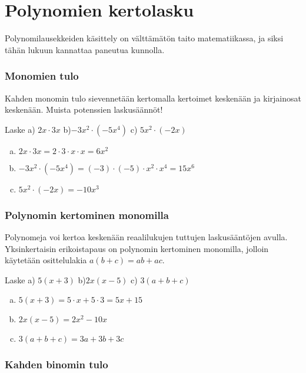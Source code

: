 \section{Polynomien kertolasku}

Polynomilausekkeiden käsittely on välttämätön taito matematiikassa, ja siksi tähän lukuun kannattaa paneutua kunnolla.

\subsubsection*{Monomien tulo}

Kahden monomin tulo sievennetään kertomalla kertoimet keskenään ja kirjainosat keskenään. Muista potenssien laskusäännöt!

\begin{esimerkki}
Laske \quad a) $2x\cdot 3x$ \quad b)$-3x^2\cdot (-5x^4)$ \quad 
c) $5x^2 \cdot (-2x)$
\begin{enumerate}[a)]
    \item $2x\cdot 3x = 2\cdot 3\cdot x\cdot x = 6x^2$
    \item $-3x^2\cdot (-5x^4) = (-3)\cdot (-5) \cdot x^2 \cdot x^4 = 15 x^6$
    \item $5x^2 \cdot (-2x) = -10 x^3$
\end{enumerate} 
\end{esimerkki}

\subsubsection*{Polynomin kertominen monomilla}

Polynomeja voi kertoa keskenään reaalilukujen tuttujen laskusääntöjen avulla. Yksinkertaisin erikoistapaus on polynomin kertominen monomilla, jolloin
käytetään osittelulakia $a(b+c)=ab+ac$.

\begin{esimerkki}
Laske \quad a) $5(x+3)$ \quad b)$2x(x-5)$ \quad 
c) $3(a+b+c)$
\begin{enumerate}[a)]
    \item $5(x+3) = 5\cdot x + 5\cdot 3 = 5x+15$
    \item $2x(x-5)=2x^2-10x$
    \item $3(a+b+c)=3a+3b+3c$
\end{enumerate}
\end{esimerkki} 

\subsubsection*{Kahden binomin tulo}

